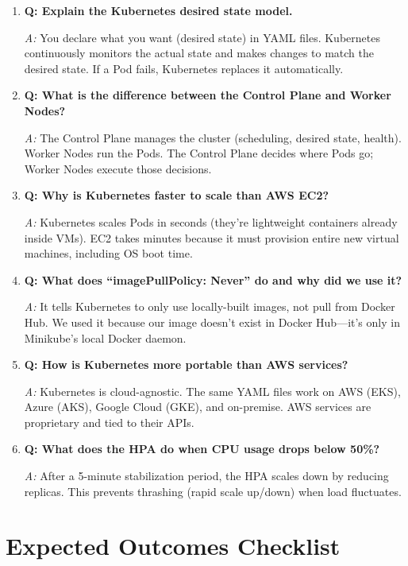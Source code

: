 \documentclass[12pt,a4paper]{article}
\begin{document}
\begin{enumerate}
    \item \textbf{Q: Explain the Kubernetes desired state model.}

    \textit{A:} You declare what you want (desired state) in YAML files. Kubernetes continuously monitors the actual state and makes changes to match the desired state. If a Pod fails, Kubernetes replaces it automatically.

    \item \textbf{Q: What is the difference between the Control Plane and Worker Nodes?}

    \textit{A:} The Control Plane manages the cluster (scheduling, desired state, health). Worker Nodes run the Pods. The Control Plane decides where Pods go; Worker Nodes execute those decisions.

    \item \textbf{Q: Why is Kubernetes faster to scale than AWS EC2?}

    \textit{A:} Kubernetes scales Pods in seconds (they're lightweight containers already inside VMs). EC2 takes minutes because it must provision entire new virtual machines, including OS boot time.

    \item \textbf{Q: What does ``imagePullPolicy: Never'' do and why did we use it?}

    \textit{A:} It tells Kubernetes to only use locally-built images, not pull from Docker Hub. We used it because our image doesn't exist in Docker Hub—it's only in Minikube's local Docker daemon.

    \item \textbf{Q: How is Kubernetes more portable than AWS services?}

    \textit{A:} Kubernetes is cloud-agnostic. The same YAML files work on AWS (EKS), Azure (AKS), Google Cloud (GKE), and on-premise. AWS services are proprietary and tied to their APIs.

    \item \textbf{Q: What does the HPA do when CPU usage drops below 50\%?}

    \textit{A:} After a 5-minute stabilization period, the HPA scales down by reducing replicas. This prevents thrashing (rapid scale up/down) when load fluctuates.
\end{enumerate}

\section{Expected Outcomes Checklist}
\end{document}
